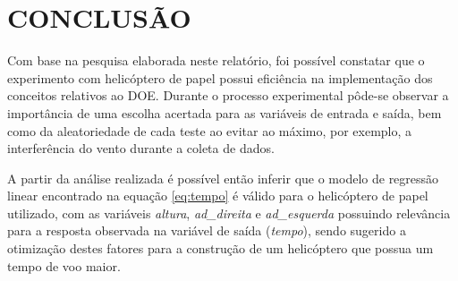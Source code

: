 \chapter{CONCLUSÃO}
\label{chap:conclusao}

Com base na pesquisa elaborada neste relatório, foi possível constatar que o experimento com helicóptero de papel possui eficiência na implementação dos conceitos relativos ao \ac{DOE}. Durante o processo experimental pôde-se observar a importância de uma escolha acertada para as variáveis de entrada e saída, bem como da aleatoriedade de cada teste ao evitar ao máximo, por exemplo, a interferência do vento durante a coleta de dados.

A partir da análise realizada é possível então inferir que o modelo de regressão linear encontrado na equação \ref{eq:tempo} é válido para o helicóptero de papel utilizado, com as variáveis \textit{altura}, \textit{ad\_direita} e \textit{ad\_esquerda} possuindo relevância para a resposta observada na variável de saída (\textit{tempo}), sendo sugerido a otimização destes fatores para a construção de um helicóptero que possua um tempo de voo maior.